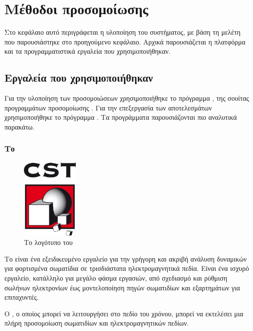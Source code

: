 \chapter{Μέθοδοι προσομοίωσης}
Στο κεφάλαιο αυτό περιγράφεται η υλοποίηση του συστήματος, με βάση τη μελέτη που παρουσιάστηκε στο προηγούμενο κεφάλαιο. 
Αρχικά παρουσιάζεται η πλατφόρμα και τα προγραμματιστικά εργαλεία που χρησιμοποιήθηκαν. 

\section{Εργαλεία που χρησιμοποιήθηκαν}
Για την υλοποίηση των προσομοιώσεων χρησιμοποιήθηκε το πρόγραμμα , της σουίτας προγραμμάτων προσομοίωσης . 
Για την επεξεργασία των αποτελεσμάτων χρησιμοποιήθηκε το πρόγραμμα . 
Τα προγράμματα παρουσιάζονται πιο αναλυτικά παρακάτω.

\subsection{Το }
\begin{figure}[tph]
\includegraphics[width=0.25\textwidth]{images/CST-logo.png}
\centering
\caption{Το λογότυπο του }
\label{img:CSTlogo}
\end{figure}
Το  είναι ένα εξειδικευμένο εργαλείο για την γρήγορη και ακριβή ανάλυση δυναμικών για φορτισμένα σωματίδια σε τρισδιάστατα ηλεκτρομαγνητικά πεδία.
Είναι ένα ισχυρό εργαλείο, κατάλληλο για μεγάλο φάσμα εργασιών, από σχεδιασμό  και ρύθμιση σωλήνων ηλεκτρονίων έως μοντελοποίηση πηγών σωματιδίων και εξαρτημάτων για επιταχυντές.

Ο , ο οποίος μπορεί να λειτουργήσει στο πεδίο του χρόνου, μπορεί να εκτελέσει μια πλήρη προσομοίωση σωματιδίων και ηλεκτρομαγνητικών πεδίων.

